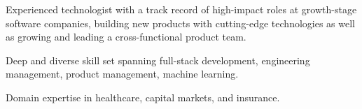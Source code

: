 

\begin{cvparagraph}

Experienced technologist with a track record of high-impact roles at growth-stage software companies,
building new products with cutting-edge technologies as well as growing and leading a cross-functional product team.

Deep and diverse skill set spanning full-stack development, engineering management, product management, machine learning.

Domain expertise in healthcare, capital markets, and insurance.
\end{cvparagraph}
